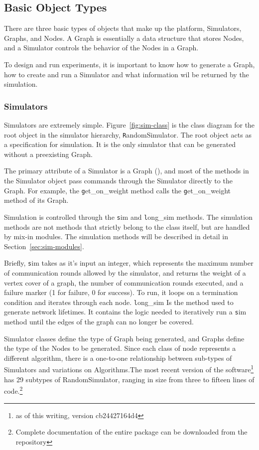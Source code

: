 \subsection{Basic Object Types}
\label{sec:sim-objects}

There are three basic types of objects that make up the platform, Simulators, Graphs, and Nodes. A Graph is essentially a data structure that stores Nodes, and a Simulator controls the behavior of the Nodes in a Graph. 

To design and run experiments, it is important to know how to generate a Graph, how to create and run a Simulator and what information wil be returned by the simulation. 

\subsubsection{Simulators}

Simulators are extremely simple. Figure~\ref{fig:sim-class} is the class diagram for the root object in the simulator hierarchy, {\texttt RandomSimulator}. The root object acts as a specification for simulation. It is the only simulator that can be generated without a preexisting Graph. 

The primary attribute of a Simulator is a Graph ({\texttt \@rg}), and most of the methods in the Simulator object pass commands through the Simulator directly to the Graph. For example, the {\texttt get\_on\_weight} method calls the {\texttt get\_on\_weight} method of its Graph.

Simulation is controlled through the {\texttt sim} and {\texttt long\_sim} methods. The simulation methods are not methods that strictly belong to the class itself, but are handled by mix-in modules. The simulation methods will be described in detail in Section~\ref{sec:sim-modules}. 

Briefly, {\texttt sim} takes as it's input an integer, which represents the maximum number of communication rounds allowed by the simulator, and returns the weight of a vertex cover of a graph, the number of communication rounds executed, and a failure marker (1 for failure, 0 for success). To run, it loops on a termination condition and iterates through each node. {\texttt long\_sim} Is the method used to generate network lifetimes. It contains the logic needed to iteratively run a {\texttt sim} method until the edges of the graph can no longer be covered. 

Simulator classes define the type of Graph being generated, and Graphs define the type of the Nodes to be generated. Since each class of node represents a different algorithm, there is a one-to-one relationship between sub-types of Simulators and variations on Algorithms.The most recent version of the software\footnote{as of this writing, version cb24427164d4} has 29 subtypes of RandomSimulator, ranging in size from three to fifteen lines of code.\footnote{Complete documentation of the entire package can be downloaded from the repository}

